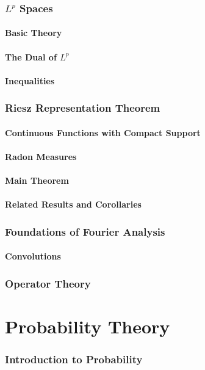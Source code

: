 \documentclass{article}
\theoremstyle{definition}
\begin{document}
	\section{$ L^p $ Spaces}
	\subsection{Basic Theory}
	\subsection{The Dual of $ L^p $}
	\subsection{Inequalities}
	\section{Riesz Representation Theorem}
	\subsection{Continuous Functions with Compact Support}
	\subsection{Radon Measures}
	\subsection{Main Theorem}
	\subsection{Related Results and Corollaries}
	\section{Foundations of Fourier Analysis}
	\subsection{Convolutions}
	\section{Operator Theory}
	\part{Probability Theory}
	\section{Introduction to Probability}
\end{document}
